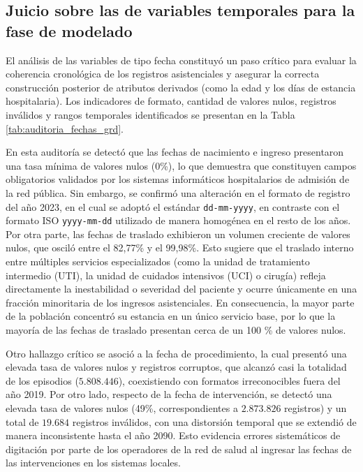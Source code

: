 \subsection{Juicio sobre las de variables temporales para la fase de modelado}

El análisis de las variables de tipo fecha constituyó un paso crítico para evaluar la coherencia cronológica de los registros asistenciales y asegurar la correcta construcción posterior de atributos derivados (como la edad y los días de estancia hospitalaria). Los indicadores de formato, cantidad de valores nulos, registros inválidos y rangos temporales identificados se presentan en la Tabla \ref{tab:auditoria_fechas_grd}.

En esta auditoría se detectó que las fechas de nacimiento e ingreso presentaron una tasa mínima de valores nulos (0\%), lo que demuestra que constituyen campos obligatorios validados por los sistemas informáticos hospitalarios de admisión de la red pública. Sin embargo, se confirmó una alteración en el formato de registro del año 2023, en el cual se adoptó el estándar \texttt{dd-mm-yyyy}, en contraste con el formato ISO \texttt{yyyy-mm-dd} utilizado de manera homogénea en el resto de los años. Por otra parte, las fechas de traslado exhibieron un volumen creciente de valores nulos, que osciló entre el 82,77\% y el 99,98\%. Esto sugiere que el traslado interno entre múltiples servicios especializados (como la unidad de tratamiento intermedio (UTI), la unidad de cuidados intensivos (UCI) o cirugía) refleja directamente la inestabilidad o severidad del paciente y ocurre únicamente en una fracción minoritaria de los ingresos asistenciales. En consecuencia, la mayor parte de la población concentró su estancia en un único servicio base, por lo que la mayoría de las fechas de traslado presentan cerca de un 100 \% de valores nulos.

Otro hallazgo crítico se asoció a la fecha de procedimiento, la cual presentó una elevada tasa de valores nulos y registros corruptos, que alcanzó casi la totalidad de los episodios ($5.808.446$), coexistiendo con formatos irreconocibles fuera del año 2019. Por otro lado, respecto de la fecha de intervención, se detectó una elevada tasa de valores nulos (49\%, correspondientes a $2.873.826$ registros) y un total de $19.684$ registros inválidos, con una distorsión temporal que se extendió de manera inconsistente hasta el año 2090. Esto evidencia errores sistemáticos de digitación por parte de los operadores de la red de salud al ingresar las fechas de las intervenciones en los sistemas locales.

